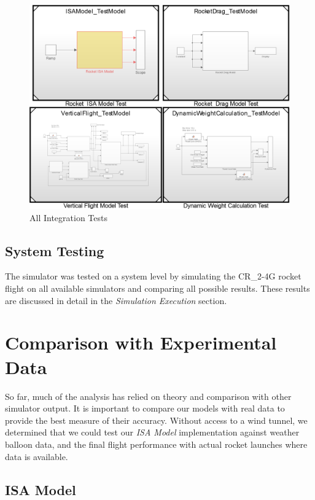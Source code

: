 \documentclass[]{article}
\begin{document}
\begin{figure}[htbp]
\centering
\includegraphics{images/ALL_TESTS.png}
\caption{All Integration Tests \label{all_integration_tests_label}}
\end{figure}

\clearpage

\subsection{System Testing}\label{system-testing}

The simulator was tested on a system level by simulating the CR\_2-4G
rocket flight on all available simulators and comparing all possible
results. These results are discussed in detail in the \emph{Simulation
Execution} section.

\section{Comparison with Experimental
Data}\label{comparison-with-experimental-data}

So far, much of the analysis has relied on theory and comparison with
other simulator output. It is important to compare our models with real
data to provide the best measure of their accuracy. Without access to a
wind tunnel, we determined that we could test our \emph{ISA Model}
implementation against weather balloon data, and the final flight
performance with actual rocket launches where data is available.

\subsection{ISA Model}\label{isa-model}
\end{document}
